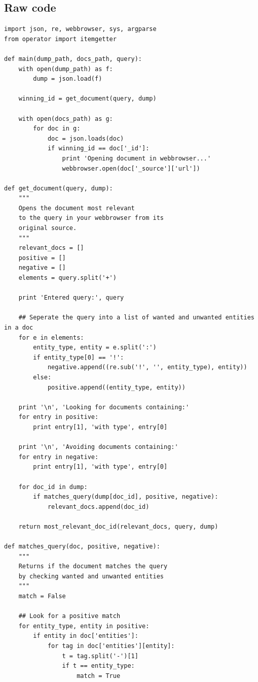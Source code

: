 \subsection{Raw code}
\begin{lstlisting}
import json, re, webbrowser, sys, argparse
from operator import itemgetter

def main(dump_path, docs_path, query):
    with open(dump_path) as f:
        dump = json.load(f)

    winning_id = get_document(query, dump)

    with open(docs_path) as g:
        for doc in g:
            doc = json.loads(doc)
            if winning_id == doc['_id']:
                print 'Opening document in webbrowser...'
                webbrowser.open(doc['_source']['url'])    

def get_document(query, dump):
    """
    Opens the document most relevant
    to the query in your webbrowser from its 
    original source.
    """
    relevant_docs = []
    positive = []
    negative = []
    elements = query.split('+')

    print 'Entered query:', query

    ## Seperate the query into a list of wanted and unwanted entities in a doc
    for e in elements:
        entity_type, entity = e.split(':')
        if entity_type[0] == '!':
            negative.append((re.sub('!', '', entity_type), entity))
        else:
            positive.append((entity_type, entity))

    print '\n', 'Looking for documents containing:'
    for entry in positive:
        print entry[1], 'with type', entry[0]

    print '\n', 'Avoiding documents containing:'
    for entry in negative:
        print entry[1], 'with type', entry[0]

    for doc_id in dump:
        if matches_query(dump[doc_id], positive, negative):
            relevant_docs.append(doc_id)

    return most_relevant_doc_id(relevant_docs, query, dump)

def matches_query(doc, positive, negative):
    """
    Returns if the document matches the query
    by checking wanted and unwanted entities
    """
    match = False

    ## Look for a positive match
    for entity_type, entity in positive:
        if entity in doc['entities']:
            for tag in doc['entities'][entity]:
                t = tag.split('-')[1]
                if t == entity_type:
                    match = True
    

\end{lstlisting}
